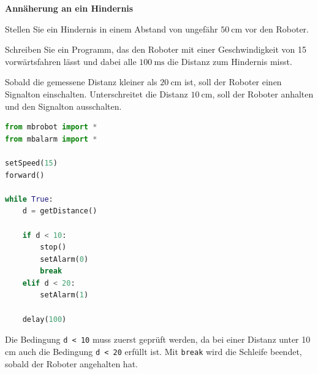 \begin{myexercise}
    \textbf{Annäherung an ein Hindernis}

    Stellen Sie ein Hindernis in einem Abstand von ungefähr
    \(\SI{50}{\centi\meter}\) vor den Roboter.

    Schreiben Sie ein Programm, das den Roboter mit einer
    Geschwindigkeit von 15 vorwärtsfahren lässt und dabei
    alle \(\SI{100}{\milli\second}\) die Distanz zum Hindernis misst.

    Sobald die gemessene Distanz kleiner als
    \(\SI{20}{\centi\meter}\) ist, soll der Roboter einen
    Signalton einschalten. Unterschreitet die Distanz
    \(\SI{10}{\centi\meter}\), soll der Roboter anhalten
    und den Signalton ausschalten.

    \begin{myanswer}
        \begin{lstlisting}[language=Python]
from mbrobot import *
from mbalarm import *

setSpeed(15)
forward()

while True:
    d = getDistance()

    if d < 10:
        stop()
        setAlarm(0)
        break
    elif d < 20:
        setAlarm(1)

    delay(100)
        \end{lstlisting}

        Die Bedingung \texttt{d < 10} muss zuerst geprüft
        werden, da bei einer Distanz unter 10 cm auch
        die Bedingung \texttt{d < 20} erfüllt ist.
        Mit \texttt{break} wird die Schleife beendet,
        sobald der Roboter angehalten hat.
    \end{myanswer}
\end{myexercise}


